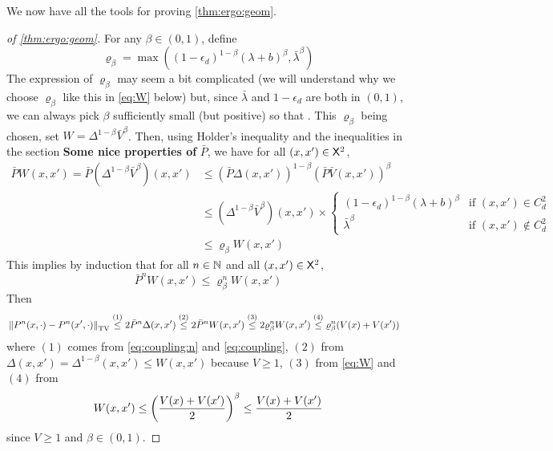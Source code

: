 \documentclass[english,graybox,envcountchap,envcountsame,sectrefs,shortlabels]{svmono}
\theoremstyle{style}
\begin{document}
We now have all the tools for proving \autoref{thm:ergo:geom}.
\begin{proof}[of  \autoref{thm:ergo:geom}]
For any $\beta\in (0,1)$, define
\begin{equation}
\varrho_\beta=\max((1-\epsilon_d)^{1-\beta} (\lambda +b)^\beta, \bar \lambda^{\beta})
\end{equation}
The expression of $\varrho_\beta$ may seem a bit complicated (we will understand why we choose $\varrho_\beta$ like this in \eqref{eq:W} below) but, since $\bar \lambda$ and $1-\epsilon_d$ are both in $(0,1)$, we can always pick $\beta$ sufficiently small (but positive) so that . This $\varrho_\beta$ being chosen, set $W=\Delta^{1-\beta} \bar V^\beta$.
Then, using Holder's inequality and the inequalities in the section \textbf{Some nice properties of} $\bar P$, we have for all $(x,x')\in\mathsf{X}^2$,
\begin{align*}
\bar PW(x,x')=\bar P(\Delta^{1-\beta} \bar V^\beta )(x,x') &\leq (\bar P \Delta (x,x'))^{1-\beta} (\bar P \bar V (x,x'))^\beta \\
& \leq (\Delta^{1-\beta} \bar V^\beta) (x,x') \times \begin{cases}
(1-\epsilon_d)^{1-\beta} (\lambda +b)^\beta &\mbox{if $(x,x')\in C_d^2$} \\
\bar \lambda^{\beta}  &\mbox{if $(x,x')\notin C_d^2$}
\end{cases}\\
&\leq \varrho_\beta  W (x,x')
\end{align*}
This implies by induction that for all $n\in\mathbb{N}$ and all $(x,x')\in\mathsf{X}^2$,
\begin{equation}\label{eq:W}
\bar P^nW(x,x') \leq \varrho^n_\beta  W (x,x')
\end{equation}
Then
\begin{align*}
& \left\|P^n(x,\cdot)-P^n(x',\cdot)\right\|_{\mathrm{TV}}  \stackrel{(1)}{\leq} 2 \bar P^n \Delta(x,x') \stackrel{(2)}{\leq} 2 \bar P^n W(x,x') \stackrel{(3)}{\leq} 2\varrho_\beta^n W(x,x') \stackrel{(4)}{\leq} \varrho_\beta^n (V(x)+V(x'))
\end{align*}
where $(1)$ comes from \eqref{eq:coupling:n} and \eqref{eq:coupling}, $(2)$ from  $\Delta(x,x')=\Delta^{1-\beta}(x,x')\leq W(x,x')$ because $V\geq 1$, $(3)$ from \eqref{eq:W}
and $(4)$ from
$$
W(x,x')\leq \left(\frac{V(x)+V(x')}{2}\right)^{\beta} \leq \frac{V(x)+V(x')}{2}
$$
since $V\geq 1$ and $\beta\in(0,1)$.
\end{proof}
\end{document}
